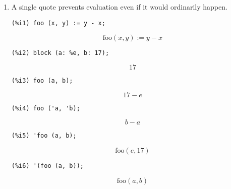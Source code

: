\documentclass[12pt,leqno]{article}
\begin{document}
\begin{enumerate}
\item A single quote prevents evaluation even if it would ordinarily happen.
\begin{verbatim}
(%i1) foo (x, y) := y - x;
\end{verbatim}
\begin{equation}
\mathrm{foo}\left(x , y\right):=y-x\tag{\%o1}
\label{eq:doc-group1-code16-1-1}
\end{equation}
\begin{verbatim}
(%i2) block (a: %e, b: 17);
\end{verbatim}
\begin{equation}
17\tag{\%o2}
\label{eq:doc-group1-code16-2-1}
\end{equation}
\begin{verbatim}
(%i3) foo (a, b);
\end{verbatim}
\begin{equation}
17-e\tag{\%o3}
\label{eq:doc-group1-code16-3-1}
\end{equation}
\begin{verbatim}
(%i4) foo ('a, 'b);
\end{verbatim}
\begin{equation}
b-a\tag{\%o4}
\label{eq:doc-group1-code16-4-1}
\end{equation}
\begin{verbatim}
(%i5) 'foo (a, b);
\end{verbatim}
\begin{equation}
\mathrm{foo}\left(e , 17\right)\tag{\%o5}
\label{eq:doc-group1-code16-5-1}
\end{equation}
\begin{verbatim}
(%i6) '(foo (a, b));
\end{verbatim}
\begin{equation}
\mathrm{foo}\left(a , b\right)\tag{\%o6}
\label{eq:doc-group1-code16-6-1}
\end{equation}



\end{enumerate}
\end{document}
